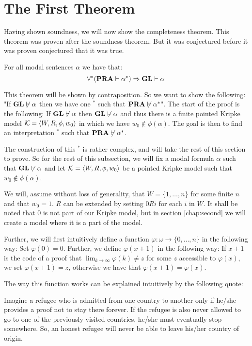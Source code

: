 \documentclass[../main.tex]{subfiles}
\begin{document}
\section{The First Theorem}
Having shown soundness, we will now show the completeness theorem. This theorem
was proven after the soundness theorem. But it was conjectured  before it was
proven conjectured that it was true. 

\begin{thm}
	For all modal sentences $\alpha$ we have that:
	\[\forall ^* (\text{\textbf{PRA}}\vdash \alpha^*)\Rightarrow \text{\textbf{GL}}\vdash \alpha\]
\end{thm}

This theorem will be shown by contraposition. So we want to show the following:
"If $\text{\textbf{GL}}\not\vdash \alpha$ then we
have one $^*$ such that $\text{\textbf{PRA}}\not\vdash\alpha^*$". 
The start of the proof is the following: If $\text{\textbf{GL}}\not\vdash\alpha$ then
$\text{\textbf{GL}}\not\vDash\alpha$ and thus there is a finite pointed Kripke model $\mathcal{K}=\langle
W,R,\phi,w_0\rangle$ in which we have $w_0\not\in\phi(\alpha)$. The goal is then to
find an interpretation $^*$ such that $\text{\textbf{PRA}}\not\vdash\alpha^*$.

The construction of this
$^*$ is rather complex, and will take the rest of this section to prove. So for the
rest of this subsection, we will fix a modal formula $\alpha$ such that $\text{\textbf{GL}}\not\vdash
\alpha$
and let $\mathcal{K}=\langle W,R,\phi,w_0\rangle$ be a pointed Kripke model such that
$w_0\not\in\phi(\alpha)$.

We will, assume without loss of generality,  
that $W=\{1,\ldots, n\}$ for some finite $n$ and that $w_0=1$.
$R$ can be extended by setting $0Ri$ for each $i$ in $W$. It shall be noted
that $0$ is not part of our Kripke model, but  in section
\ref{chap:second} we will create a model where it is a part of the model.

Further, we will first intuitively define a function $\varphi:\omega\rightarrow\{0,\ldots, n\}$ in the
following way: Set $\varphi(0)=0$. Further, we define $\varphi(x+1)$ in the following way:
If $x+1$ is the code of a proof that $\lim_{k\rightarrow\infty}\varphi(k)\not =z$ for
some $z$ accessible to $\varphi(x)$, we set $\varphi(x+1)=z$, otherwise we have that
$\varphi(x+1)=\varphi(x)$.

The way this function works can be explained intuitively by the following
quote:
\begin{displayquote}
	Imagine a refugee who is admitted from one country to another only if
	he/she provides a proof not to stay there forever. If the refugee is
	also never allowed to go to one of the previously visited countries,
	he/she must eventually stop somewhere. So, an honest refugee will never
	be able to leave his/her country of origin. \citet{ArteBe}
\end{displayquote}
\end{document}
